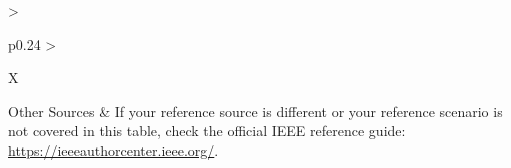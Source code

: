 \begin{xltabular}{\textwidth}{>{\bfseries\raggedright\arraybackslash}p{0.24\textwidth} >{\raggedright\arraybackslash}X}
  Other Sources & 
  If your reference source is different or your reference scenario is not covered in this table, check the official IEEE reference guide: \url{https://ieeeauthorcenter.ieee.org/}. \\
\end{xltabular}
